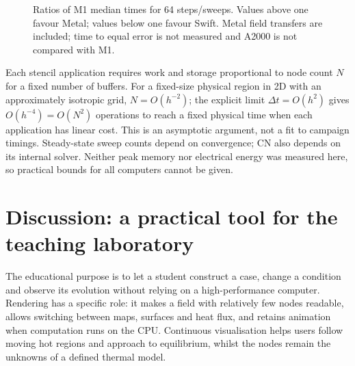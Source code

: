 \documentclass[11pt,a4paper]{article}
\newcommand{\dt}{\Delta t}
\begin{document}
\begin{figure}[tbp]\centering{}
\caption{Ratios of M1 median times for 64 steps/sweeps. Values above one favour Metal; values below one favour Swift. Metal field transfers are included; time to equal error is not measured and A2000 is not compared with M1.}\label{fig:cost}\end{figure}

Each stencil application requires work and storage proportional to node count $N$ for a fixed number of buffers. For a fixed-size physical region in 2D with an approximately isotropic grid, $N=O(h^{-2})$; the explicit limit $\dt=O(h^2)$ gives $O(h^{-4})=O(N^2)$ operations to reach a fixed physical time when each application has linear cost. This is an asymptotic argument, not a fit to campaign timings. Steady-state sweep counts depend on convergence; CN also depends on its internal solver. Neither peak memory nor electrical energy was measured here, so practical bounds for all computers cannot be given.

\section{Discussion: a practical tool for the teaching laboratory}
The educational purpose is to let a student construct a case, change a condition and observe its evolution without relying on a high-performance computer. Rendering has a specific role: it makes a field with relatively few nodes readable, allows switching between maps, surfaces and heat flux, and retains animation when computation runs on the CPU. Continuous visualisation helps users follow moving hot regions and approach to equilibrium, whilst the nodes remain the unknowns of a defined thermal model.
\end{document}
